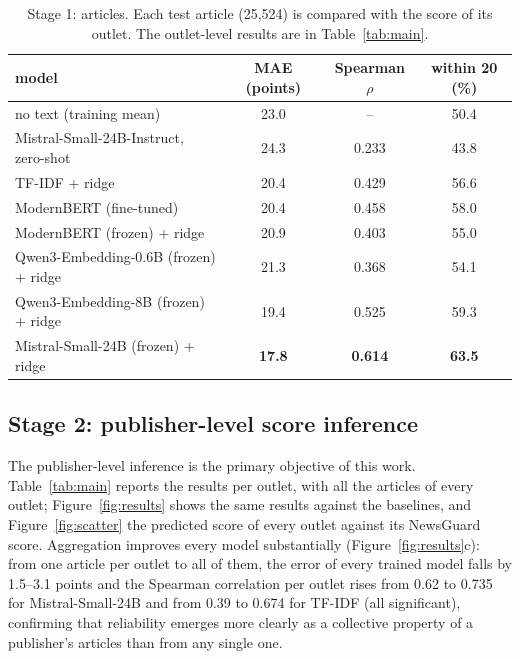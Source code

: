 \documentclass[11pt,a4paper]{article}
\begin{document}
\begin{table}[t]
\centering
\caption{Stage 1: articles. Each test article (25,524) is compared with the score of its outlet. The outlet-level
results are in Table~\ref{tab:main}.}\label{tab:article}
\begin{tabular}{lccc}
\toprule
model & MAE (points) & Spearman $\rho$ & within 20 (\%) \\
\midrule
no text (training mean) & 23.0 & -- & 50.4 \\
Mistral-Small-24B-Instruct, zero-shot & 24.3 & 0.233 & 43.8 \\
\midrule
TF-IDF + ridge & 20.4 & 0.429 & 56.6 \\
ModernBERT (fine-tuned) & 20.4 & 0.458 & 58.0 \\
ModernBERT (frozen) + ridge & 20.9 & 0.403 & 55.0 \\
Qwen3-Embedding-0.6B (frozen) + ridge & 21.3 & 0.368 & 54.1 \\
Qwen3-Embedding-8B (frozen) + ridge & 19.4 & 0.525 & 59.3 \\
Mistral-Small-24B (frozen) + ridge & \textbf{17.8} & \textbf{0.614} & \textbf{63.5} \\
\bottomrule
\end{tabular}
\end{table}

\subsection{Stage 2: publisher-level score inference}\label{sec:stage2}
The publisher-level inference is the primary objective of this work. Table~\ref{tab:main} reports the results per
outlet, with all the articles of every outlet; Figure~\ref{fig:results} shows the same results against the baselines,
and Figure~\ref{fig:scatter} the predicted score of every outlet against its NewsGuard score. Aggregation improves every
model substantially (Figure~\ref{fig:results}c): from one article per outlet to all of them, the error of every trained model falls by 1.5--3.1 points and the
Spearman correlation per outlet rises from 0.62 to 0.735 for Mistral-Small-24B and from 0.39 to 0.674 for TF-IDF (all
significant), confirming that
reliability emerges more clearly as a collective property of a publisher's articles than from any single one.
\end{document}
